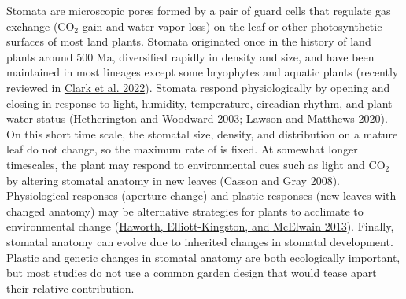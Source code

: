 \documentclass[
  12pt,
]{article}
\begin{document}
Stomata are microscopic pores formed by a pair of guard cells that regulate gas exchange (CO\(_2\) gain and water vapor loss) on the leaf or other photosynthetic surfaces of most land plants. Stomata originated once in the history of land plants around 500 Ma, diversified rapidly in density and size, and have been maintained in most lineages except some bryophytes and aquatic plants (recently reviewed in \protect\hyperlink{ref-clark_origin_2022}{Clark et al. 2022}). Stomata respond physiologically by opening and closing in response to light, humidity, temperature, circadian rhythm, and plant water status (\protect\hyperlink{ref-hetherington_role_2003}{Hetherington and Woodward 2003}; \protect\hyperlink{ref-lawson_guard_2020}{Lawson and Matthews 2020}). On this short time scale, the stomatal size, density, and distribution on a mature leaf do not change, so the maximum rate of is fixed. At somewhat longer timescales, the plant may respond to environmental cues such as light and CO\(_2\) by altering stomatal anatomy in new leaves (\protect\hyperlink{ref-casson_influence_2008}{Casson and Gray 2008}). Physiological responses (aperture change) and plastic responses (new leaves with changed anatomy) may be alternative strategies for plants to acclimate to environmental change (\protect\hyperlink{ref-haworth_co-ordination_2013}{Haworth, Elliott-Kingston, and McElwain 2013}). Finally, stomatal anatomy can evolve due to inherited changes in stomatal development. Plastic and genetic changes in stomatal anatomy are both ecologically important, but most studies do not use a common garden design that would tease apart their relative contribution.
\end{document}
